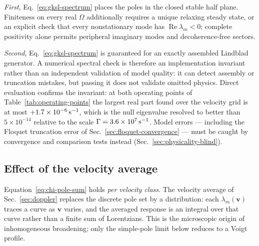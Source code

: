 \documentclass[11pt,a4paper]{article}
\newcommand{\Rea}{\operatorname{Re}}
\begin{document}
\emph{First}, Eq.~\eqref{eq:gksl-spectrum} places the poles in the closed stable
half plane. Finiteness on every real $\Omega$ additionally requires a unique
relaxing steady state, or an explicit check that every nonstationary mode has
$\Rea\lambda_m<0$; complete positivity alone permits peripheral imaginary
modes and decoherence-free sectors.

\emph{Second}, Eq.~\eqref{eq:gksl-spectrum} is guaranteed for an exactly
assembled Lindblad generator. A numerical spectral check is therefore an
implementation invariant rather than an independent validation of model
quality: it can detect assembly or truncation mistakes, but passing it does
not validate omitted physics. Direct evaluation confirms the invariant: at
both operating points of Table~\ref{tab:operating-points} the largest real
part found over the velocity grid is at most
$+1.7\times10^{-6}\,{\rm s^{-1}}$, which is the null eigenvalue resolved to
better than $5\times10^{-14}$ relative to the scale
$\Gamma=3.6\times10^{7}\,{\rm s^{-1}}$. Model errors --- including the
Floquet truncation error of Sec.~\ref{sec:floquet-convergence} --- must be
caught by convergence and comparison tests instead
(Sec.~\ref{sec:physicality-blind}).

\subsection{Effect of the velocity average}
\label{sec:pole-doppler}

Equation~\eqref{eq:chi-pole-sum} holds \emph{per velocity class}. The
velocity average of Sec.~\ref{sec:doppler} replaces the discrete pole set by
a distribution: each $\lambda_m(\bm v)$ traces a curve as $\bm v$ varies, and
the averaged response is an integral over that curve rather than a finite sum
of Lorentzians. This is the microscopic origin of inhomogeneous broadening;
only the simple-pole limit below reduces to a Voigt profile.
\end{document}
